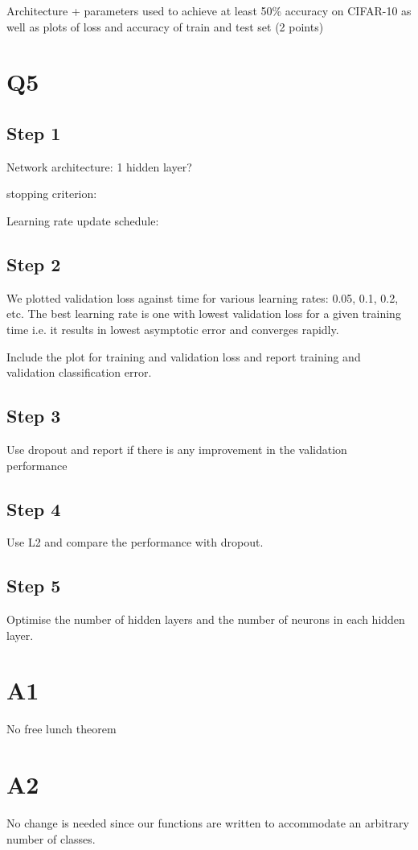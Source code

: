 \documentclass[12pt, a4paper]{article}
\begin{document}
Architecture + parameters used to achieve at least 50\% accuracy on CIFAR-10 as well as plots of loss and accuracy of train and test set (2 points)

\section*{Q5}

\subsection*{Step 1}
Network architecture: 1 hidden layer?\par
stopping criterion:\par
Learning rate update schedule:\par

\subsection*{Step 2}
We plotted validation loss against time for various learning rates: 0.05, 0.1, 0.2, etc. The best learning rate is one with lowest validation loss for a given training time i.e. it results in lowest asymptotic error and converges rapidly.\par
\bigskip
Include the plot for training and validation loss and report training and validation
classification error.

\subsection*{Step 3}
Use dropout and report if there is any improvement in the validation performance

\subsection*{Step 4}
Use L2 and compare the performance with dropout.

\subsection*{Step 5}
Optimise the number of hidden layers and the number of neurons in each hidden layer.

\section*{A1}
No free lunch theorem

\section*{A2}
No change is needed since our functions are written to accommodate an arbitrary number of classes.
\end{document}
